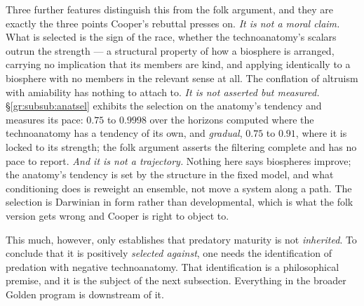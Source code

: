Three further features distinguish this from the folk argument, and they
are exactly the three points Cooper's rebuttal presses on. \emph{It is not
a moral claim.} What is selected is the sign of the race, whether the
technoanatomy's scalars outrun the strength --- a structural property of how a
biosphere is arranged, carrying no implication that its members are
kind, and applying identically to a biosphere with no members in the
relevant sense at all. The conflation of altruism with amiability has
nothing to attach to. \emph{It is not asserted but measured.}
\S\ref{gr:subsub:anatsel} exhibits the selection on the anatomy's tendency and measures its pace:
$0.75$ to $0.9998$ over the horizons computed where the technoanatomy has a tendency of its own, and \emph{gradual}, $0.75$ to $0.91$, where it is locked to its strength; the folk argument asserts the filtering complete and has no pace to report.
\emph{And it is not a trajectory.} Nothing here says biospheres improve;
the anatomy's tendency is set by the structure in the fixed model, and what conditioning
does is reweight an ensemble, not move a system along a path. The
selection is Darwinian in form rather than developmental, which is
what the folk version gets wrong and Cooper is right to object to.

This much, however, only establishes that predatory maturity is not
\emph{inherited}. To conclude that it is positively \emph{selected
against}, one needs the identification of predation with negative
technoanatomy. That identification is a philosophical premise, and it is
the subject of the next subsection. Everything in
the broader Golden program is downstream of it.

